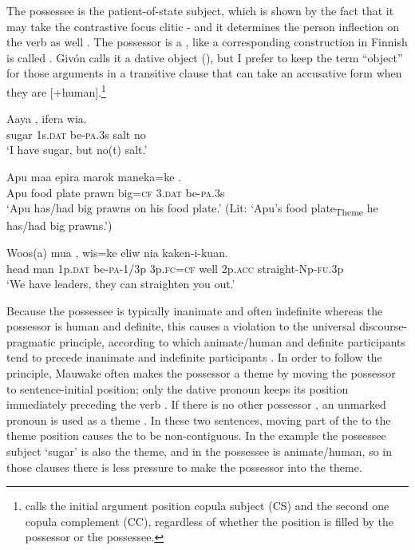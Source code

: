 The possessee is the patient-of-state subject, which is shown by the fact that it may take the contrastive focus clitic -  and it determines the person inflection on the verb as well . The possessor is a , like  a corresponding construction in Finnish is called \citep[209]{HakulinenEtAl1979}%
. Giv\'on calls it a dative object (\citeyear[104]{Givon1984}), but I prefer to keep the term ``object'' for those arguments in a transitive clause that can take an accusative form when they are [+human].\footnote{\citet[302]{Dixon2010b} calls the initial argument position copula subject (CS) and the second one copula complement (CC), regardless of whether the position is filled by the possessor or the possessee.}

\ea%
\label{ex:5:x595}
\gll Aaya    ,  ifera  wia. \\
     sugar  1s.\textsc{dat}  be-\textsc{pa}.3s  salt  no \\
\glt `I have sugar, but no(t) salt.'
\z

\ea%
\label{ex:5:x1065}
\gll Apu  maa  epira  marok  maneka=ke   . \\
     Apu  food  plate  prawn  big=\textsc{cf}  3.\textsc{dat}  be-\textsc{pa}.3s \\
\glt `Apu has/had big prawns on his food plate.' (Lit: `Apu's food plate\textsubscript{Theme} he has/had big prawns.')
\z

\ea%
\label{ex:5:x1323}
\gll Woos(a)  mua   ,  wis=ke  eliw  nia kaken-i-kuan. \\
     head  man  1p.\textsc{dat}  be-\textsc{pa}-1/3p  3p.\textsc{fc}=\textsc{cf}  well  2p.\textsc{acc} straight-Np-\textsc{fu}.3p \\
\glt `We have leaders, they can straighten you out.'
\z

Because the possessee is typically inanimate and often indefinite whereas the possessor is human and definite, this causes a violation to the universal discourse-pragmatic principle, according to which animate/human and definite participants tend to precede inanimate and indefinite participants \citep[135]{Heine1997}. In order to follow the principle, Mauwake often makes the possessor a theme by moving the possessor  to sentence-initial position; only the dative pronoun keeps its position immediately preceding the verb . If there is no other possessor , an unmarked pronoun is used as a theme . In these two sentences, moving part of the  to the theme position causes the  to be non-contiguous. In the example  the possessee subject  `sugar' is also the theme, and in  the possessee is animate/human, so in those clauses there is less pressure to make the possessor into the theme.

